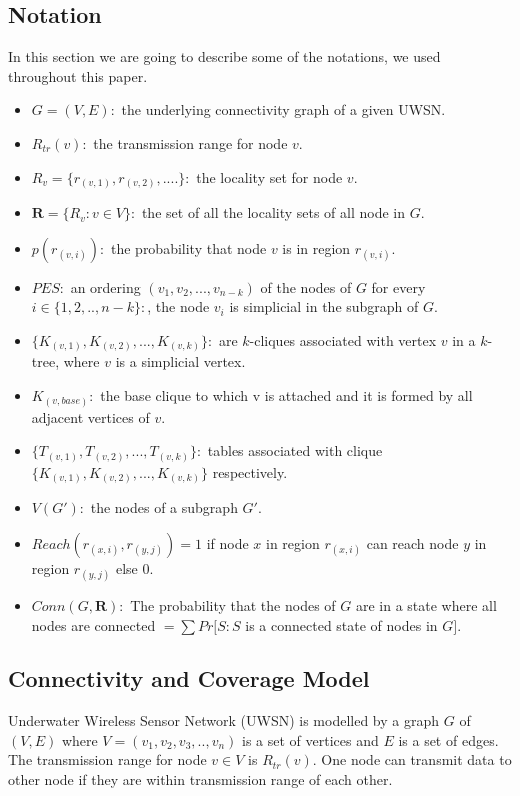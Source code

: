 \documentclass[12pt]{article}
\begin{document}
\subsection{Notation}
In this section we are going to describe some of the notations, we used throughout this paper.
\begin{itemize}[noitemsep,nolistsep]
\item $G=(V,E):$ the underlying connectivity graph of a given UWSN.
\item $R_{tr}(v):$ the transmission range for node $v$.
\item $R_v=\{r_{(v,1)},r_{(v,2)},....\}:$  the locality set for node $v$.
\item $\textbf{R}=\{ R_v:v\in V\}:$ the set of all the locality sets of all node in $G$.
\item $p(r_{(v,i)}):$ the probability that node $v$ is in region $r_{(v,i)}$.
\item $PES :$  an ordering $(v_1,v_2,...,v_{n-k})$ of the nodes of $G$ for every $i\in \{1,2,..,n-k\}:$, the node $v_i$ is simplicial in the subgraph of $G$. 
\item $\{K_{(v,1)},K_{(v,2)},...,K_{(v,k)}\}:$ are $k$-cliques associated with vertex $v$ in a $k$-tree, where $v$ is a simplicial vertex.
\item $K_{(v,base)}:$ the base clique to which v is attached and it is  formed by all adjacent vertices of $v$.
\item $\{T_{(v,1)}, T_{(v,2)},...,T_{(v,k)}\}:$ tables associated with clique $\{K_{(v,1)},K_{(v,2)},...,K_{(v,k)}\}$ respectively.
\item $V(G'):$ the nodes of a subgraph $G'$.
 
\item $Reach(r_{(x,i)},r_{(y,j)}) =1$  if node $x$ in region $r_{(x,i)}$ can reach node $y$ in region $r_{(y,j)}$ else $0$.
\item $Conn(G,\textbf{R}):$ The probability that the nodes of $G$ are in a state where all nodes are connected $= \sum Pr[S:S $ is a connected state of nodes in $G]$.
\end{itemize}
\subsection{Connectivity and Coverage Model}
\label{subsec:conAndCoverage}
Underwater Wireless Sensor Network (UWSN) is modelled by a graph $ G$ of \((V,E)\) where \(V=(v_1,v_2,v_3,..,v_n)\) is a set of vertices and $E$ is a set of edges. The transmission range for node \(v\in V\)  is  \(R_{tr}(v)\). One node can transmit data to other node if they are within transmission range of each other.
\end{document}
